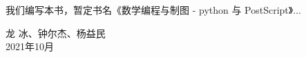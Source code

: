 \documentclass[main.tex]{subfiles}
\begin{document}
我们编写本书，暂定书名《数学编程与制图 - python 与 PostScript》...


\begin{flushright}
龙 冰、钟尔杰、杨益民\\
2021年10月
\end{flushright}
\end{document}
